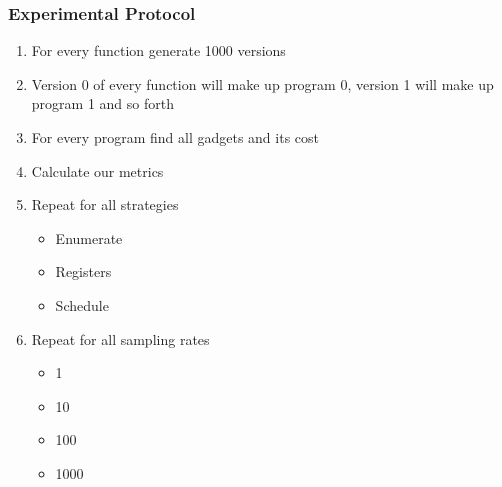 \begin{frame}
	\frametitle{Experimental Protocol}

	\begin{enumerate}
		\item For every function generate 1000 versions
		\item Version 0 of every function will make up program 0, version 1 will make up program
			1 and so forth
		\item For every program find all gadgets and its cost
		\item Calculate our metrics
		\item Repeat for all strategies
			\begin{itemize}
				\item Enumerate
				\item Registers
				\item Schedule
			\end{itemize}
		\item Repeat for all sampling rates
			\begin{itemize}
				\item 1
				\item 10
				\item 100
				\item 1000
			\end{itemize}
	\end{enumerate}

\end{frame}

